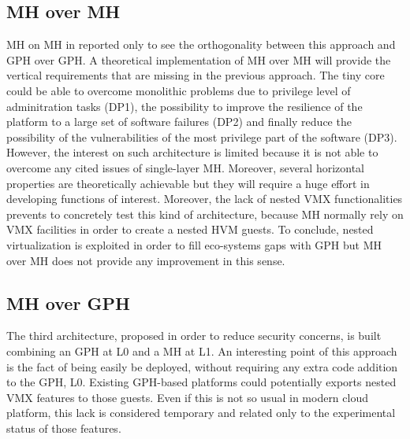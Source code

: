 \documentclass{acm_proc_article-sp} %
\begin{document}
\subsection{MH over MH}

MH on MH in reported only to see the orthogonality between this approach and GPH over GPH.
A theoretical implementation of MH over MH will provide the vertical requirements that are missing in the previous approach. The tiny core could be able to overcome monolithic problems due to privilege level of adminitration tasks (DP1), the possibility to improve the resilience of the platform to a large set of software failures (DP2) and finally reduce the possibility of the vulnerabilities of the most privilege part of the software (DP3). However, the interest on such architecture is limited because it is not able to overcome any cited issues of single-layer MH. Moreover, several horizontal properties are theoretically achievable but they will require a huge effort in developing functions of interest. Moreover, the lack of nested VMX functionalities prevents to concretely test this kind of architecture, because MH normally rely on VMX facilities in order to create a nested HVM guests.
To conclude, nested virtualization is exploited in order to fill eco-systems gaps with GPH but MH over MH does not provide any improvement in this sense.

\subsection{MH over GPH}
\label{par:mog}

The third architecture, proposed in order to reduce security concerns, is built combining an GPH at L0 and a MH at L1. 
An interesting point of this approach is the fact of being easily be deployed, without requiring any extra code addition to the GPH, L0.  Existing GPH-based platforms could potentially exports nested VMX features to those guests. Even if this is not so usual in modern cloud platform, this lack is considered temporary and related only to the experimental status of those features.
\end{document}
